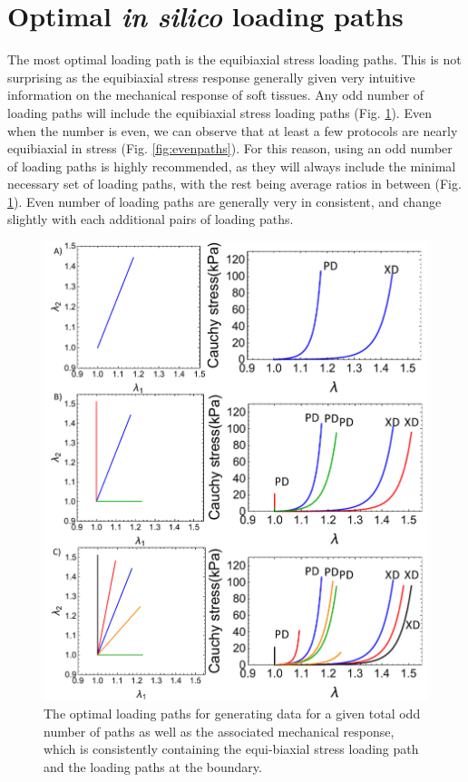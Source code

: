 \section{Optimal \textit{in silico} loading paths} \label{sec:optimalpaths}

	The most optimal loading path is the equibiaxial stress loading paths. This is not surprising as the equibiaxial stress response generally given very intuitive information on the mechanical response of soft tissues. Any odd number of loading paths will include the equibiaxial stress loading paths (Fig. \ref{fig:oddpaths}). Even when the number is even, we can observe that at least a few protocols are nearly equibiaxial in stress (Fig. \ref{fig:evenpaths}). For this reason, using an odd number of loading paths is highly recommended, as they will always include the minimal necessary set of loading paths, with the rest being average ratios in between (Fig. \ref{fig:oddpaths}). Even number of loading paths are generally very in consistent, and change slightly with each additional pairs of loading paths.  

\begin{figure}
\centering
\includegraphics[width=6.5in]{Figures/oddpaths}
\caption{The optimal loading paths for generating data for a given total odd number of paths as well as the associated mechanical response, which is consistently containing the equi-biaxial stress loading path and the loading paths at the boundary.}
\label{fig:oddpaths}
\end{figure} 


